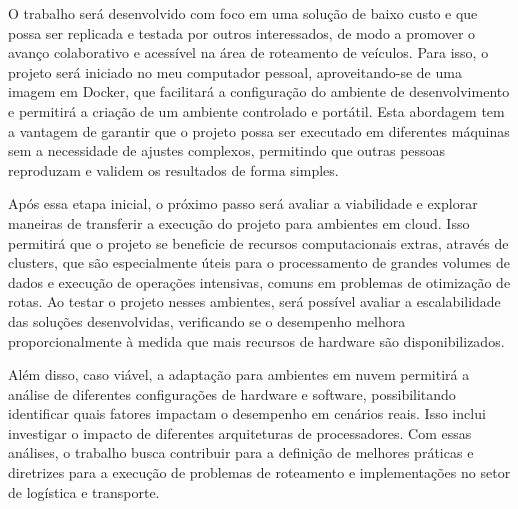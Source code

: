 \documentclass[
    openany,
    12pt,
    a4paper,
    twoside,
    english,
    brazil, sumario=tradicional
]{/home/lucas_galdino/Desktop/TCC/planning/abntex2/abntex2}
\begin{document}
O trabalho será desenvolvido com foco em uma solução de baixo custo e que possa ser replicada e testada por outros interessados, 
de modo a promover o avanço colaborativo e acessível na área de roteamento de veículos. Para isso, o projeto será iniciado no meu computador pessoal,
aproveitando-se de uma imagem em Docker, que facilitará a configuração do ambiente de desenvolvimento 
e permitirá a criação de um ambiente controlado e portátil. Esta abordagem tem a vantagem de garantir que o projeto possa ser executado 
em diferentes máquinas sem a necessidade de ajustes complexos, permitindo que outras pessoas reproduzam e validem os resultados de 
forma simples.

Após essa etapa inicial, o próximo passo será avaliar a viabilidade e explorar maneiras de transferir a execução do projeto para ambientes em cloud. 
Isso permitirá que o projeto se beneficie de recursos computacionais extras, através de clusters, que são especialmente úteis para o processamento de 
grandes volumes de dados e execução de operações intensivas, comuns em problemas de otimização de rotas. Ao testar o projeto nesses ambientes, 
será possível avaliar a escalabilidade das soluções desenvolvidas, verificando se o desempenho melhora proporcionalmente à medida que mais recursos 
de hardware são disponibilizados.

Além disso, caso viável, a adaptação para ambientes em nuvem permitirá a análise de diferentes configurações de hardware e software, possibilitando 
identificar quais fatores impactam o desempenho em cenários reais. Isso inclui investigar o impacto de diferentes arquiteturas de processadores. 
Com essas análises, o trabalho busca contribuir para a definição de melhores práticas e diretrizes para a execução de problemas de roteamento e implementações no setor de logística e transporte.


\end{document}
